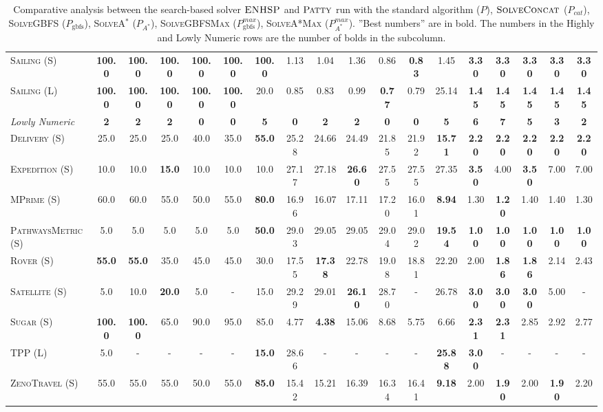 \documentclass[11pt,landscape]{article}
\begin{document}
\begin{table*}[tb]
{\begin{tabular}{|l||cccccc||cccccc||ccccc||}
\textsc{Sailing} (S)&\textbf{100.0}&\textbf{100.0}&\textbf{100.0}&\textbf{100.0}&\textbf{100.0}&\textbf{100.0}&1.13&1.04&1.36&0.86&\textbf{0.83}&1.45&\textbf{3.30}&\textbf{3.30}&\textbf{3.30}&\textbf{3.30}&\textbf{3.30}\\
\textsc{Sailing} (L)&\textbf{100.0}&\textbf{100.0}&\textbf{100.0}&\textbf{100.0}&\textbf{100.0}&20.0&0.85&0.83&0.99&\textbf{0.77}&0.79&25.14&\textbf{1.45}&\textbf{1.45}&\textbf{1.45}&\textbf{1.45}&\textbf{1.45}
\\\hline
\textit{Lowly Numeric}&\textbf{2}&\textbf{2}&\textbf{2}&\textbf{0}&\textbf{0}&\textbf{5}&\textbf{0}&\textbf{2}&\textbf{2}&\textbf{0}&\textbf{0}&\textbf{5}&\textbf{6}&\textbf{7}&\textbf{5}&\textbf{3}&\textbf{2}\\\hline
\textsc{Delivery} (S)&25.0&25.0&25.0&40.0&35.0&\textbf{55.0}&25.28&24.66&24.49&21.85&21.92&\textbf{15.71}&\textbf{2.20}&\textbf{2.20}&\textbf{2.20}&\textbf{2.20}&\textbf{2.20}\\
\textsc{Expedition} (S)&10.0&10.0&\textbf{15.0}&10.0&10.0&10.0&27.17&27.18&\textbf{26.60}&27.55&27.55&27.35&\textbf{3.50}&4.00&\textbf{3.50}&7.00&7.00\\
\textsc{MPrime} (S)&60.0&60.0&55.0&50.0&55.0&\textbf{80.0}&16.96&16.07&17.11&17.20&16.01&\textbf{8.94}&1.30&\textbf{1.20}&1.40&1.40&1.30\\
\textsc{PathwaysMetric} (S)&5.0&5.0&5.0&5.0&5.0&\textbf{50.0}&29.03&29.05&29.05&29.04&29.02&\textbf{19.54}&\textbf{1.00}&\textbf{1.00}&\textbf{1.00}&\textbf{1.00}&\textbf{1.00}\\
\textsc{Rover} (S)&\textbf{55.0}&\textbf{55.0}&35.0&45.0&45.0&30.0&17.55&\textbf{17.38}&22.78&19.08&18.81&22.20&2.00&\textbf{1.86}&\textbf{1.86}&2.14&2.43\\
\textsc{Satellite} (S)&5.0&10.0&\textbf{20.0}&5.0&-&15.0&29.29&29.01&\textbf{26.10}&28.70&-&26.78&\textbf{3.00}&\textbf{3.00}&\textbf{3.00}&5.00&-\\
\textsc{Sugar} (S)&\textbf{100.0}&\textbf{100.0}&65.0&90.0&95.0&85.0&4.77&\textbf{4.38}&15.06&8.68&5.75&6.66&\textbf{2.31}&\textbf{2.31}&2.85&2.92&2.77\\
\textsc{TPP} (L)&5.0&-&-&-&-&\textbf{15.0}&28.66&-&-&-&-&\textbf{25.88}&\textbf{3.00}&-&-&-&-\\
\textsc{ZenoTravel} (S)&55.0&55.0&55.0&50.0&55.0&\textbf{85.0}&15.42&15.21&16.39&16.34&16.41&\textbf{9.18}&2.00&\textbf{1.90}&2.00&\textbf{1.90}&2.20
\\\hline

        \end{tabular}}
        \caption{Comparative analysis between the search-based solver $\textsc{ENHSP}$ and  $\textsc{Patty}$ run with the standard algorithm ($P$),  $\textsc{SolveConcat}$ ($P_{cat}$), \textsc{SolveGBFS} ($P_\text{gbfs}$), \textsc{SolveA}$^*$ ($P_{A^*}$), \textsc{SolveGBFSMax} ($P_\text{gbfs}^{max}$), \textsc{SolveA*Max} ($P_{A^*}^{max}$). ''Best numbers'' are in bold.  The numbers in the Highly and Lowly Numeric rows are the number of bolds in the subcolumn.}
        \label{tab:experiments}
        \end{table*}
        
\end{document}
